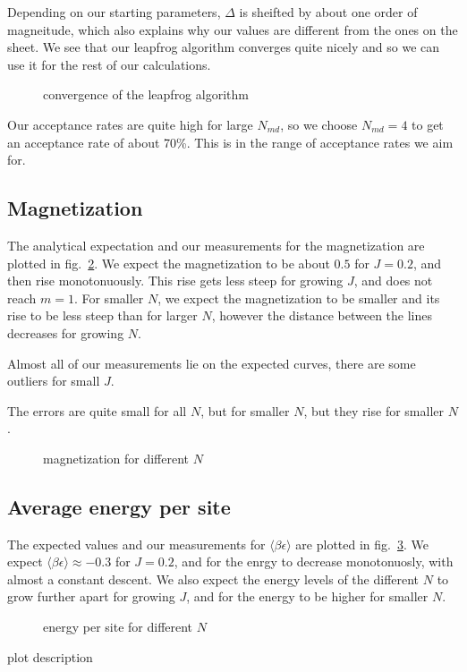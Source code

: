 \documentclass{scrartcl}
\begin{document}
Depending on our starting parameters, $\Delta$ is sheifted by about one order of magneitude, which also explains why our values are different from the ones on the sheet.
We see that our leapfrog algorithm converges quite nicely and so we can use it for the rest of our calculations.
\begin{figure}[htbp]
	
	\caption{convergence of the leapfrog algorithm}
	\label{fig:converge}
\end{figure}

Our acceptance rates are quite high for large $N_{md}$, so we choose $N_{md}=4$ to get an acceptance rate of about 70\%. This is in the range of acceptance rates we aim for.
\subsection{Magnetization}

The analytical expectation and our measurements for the magnetization are plotted in fig.~\ref{fig:magnetization}. We expect the magnetization to be about $0.5$ for $J=0.2$, and then rise monotonuously. This rise gets less steep for growing $J$, and does not reach $m=1$. For smaller $N$, we expect the magnetization to be smaller and its rise to be less steep than for larger $N$, however the distance between the lines decreases for growing $N$.

Almost all of our measurements lie on the expected curves, there are some outliers for small $J$. 

The errors are quite small for all $N$, but for smaller $N$, but they rise for smaller $N$.
\begin{figure}[htbp]
	
	\caption{magnetization for different $N$}
	\label{fig:magnetization}
\end{figure}

\subsection{Average energy per site}

The expected values and our measurements for $\langle \beta\epsilon\rangle$ are plotted in fig.~\ref{fig:energy}. We expect $\langle \beta\epsilon\rangle\approx-0.3$ for $J=0.2$, and for the enrgy to decrease monotonuosly, with almost a constant descent. We also expect the energy levels of the different $N$ to grow further apart for growing $J$, and for the energy to be higher for smaller $N$.
\begin{figure}[htbp]
	
	\caption{energy per site for different $N$}
	\label{fig:energy}
\end{figure}
plot description

\newpage	
\listoffigures
\printbibliography
\end{document}
